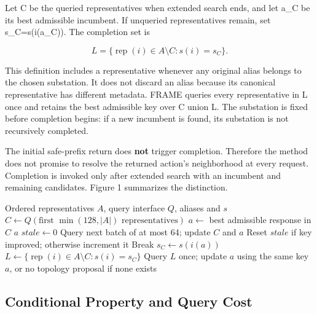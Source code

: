 \documentclass[letterpaper]{article}
\begin{document}
Let C be the queried representatives when extended search ends, and let a\_C be its best admissible incumbent. If unqueried representatives remain, set s\_C=s(i(a\_C)). The completion set is


\begin{equation}
L=\{\operatorname{rep}(i)\in A\setminus C:s(i)=s_C\}.
\end{equation}

This definition includes a representative whenever any original alias belongs to the chosen substation. It does not discard an alias because its canonical representative has different metadata. FRAME queries every representative in L once and retains the best admissible key over C union L. The substation is fixed before completion begins: if a new incumbent is found, its substation is not recursively completed.


The initial safe-prefix return does \textbf{not} trigger completion. Therefore the method does not promise to resolve the returned action's neighborhood at every request. Completion is invoked only after extended search with an incumbent and remaining candidates. Figure 1 summarizes the distinction.


\begin{algorithm}[t]
\caption{Progressive Search with Substation Completion (FRAME)}
\label{alg:frame}
\begin{algorithmic}[1]
\REQUIRE Ordered representatives $A$, query interface $Q$, aliases and $s$
\STATE $C\gets Q(\text{first }\min(128,|A|)\text{ representatives})$
\STATE $a\gets$ best admissible response in $C$
  \RETURN $a$
\ENDIF
\STATE $stale\gets 0$
  \STATE Query next batch of at most 64; update $C$ and $a$
  \STATE Reset $stale$ if key improved; otherwise increment it
    \STATE Break
  \ENDIF
\ENDWHILE
{}
  \STATE $s_C\gets s(i(a))$
  \STATE $L\gets\{\operatorname{rep}(i)\in A\setminus C:s(i)=s_C\}$
  \STATE Query $L$ once; update $a$ using the same key
\ENDIF
\RETURN $a$, or no topology proposal if none exists
\end{algorithmic}
\end{algorithm}

\subsection{Conditional Property and Query Cost}
\end{document}
